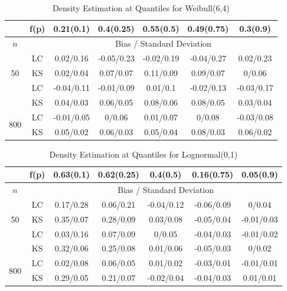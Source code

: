 \documentclass[12pt]{article}
\numberwithin{equation}{section}
\begin{document}
	
\begin{table}[H]

\begin{center}
\caption{Density Estimation at Quantiles for Weibull(6,4)}
\begin{tabular} {| c | c | c | c | c | c | c | } 

	 \hline
		&f(p)&	0.21(0.1)&	0.4(0.25)&	0.55(0.5)&	0.49(0.75)&	0.3(0.9)\\ 
 \hline 
 	$n$ & & \multicolumn{5}{|c|}{Bias / Standard Deviation} 
 \\ 
 \hline 
\multirow{3}{*}{50}		&	LC	&0.02/0.16	&-0.05/0.23	&-0.02/0.19	&-0.04/0.27	&0.02/0.23\\ 
			&	KS	&0.02/0.04	&0.07/0.07	&0.11/0.09	&0.09/0.07	&0/0.06\\ 
	\hline 
\multirow{3}{*}{200}		&	LC	&-0.04/0.11	&-0.01/0.09	&0.01/0.1	&-0.02/0.13	&-0.03/0.17\\ 
			&	KS	&0.04/0.03	&0.06/0.05	&0.08/0.06	&0.08/0.05	&0.03/0.04\\ 
	\hline 
\multirow{3}{*}{800}		&	LC	&-0.01/0.05	&0/0.06	&0.01/0.07	&0/0.08	&-0.03/0.08\\ 
			&	KS	&0.05/0.02	&0.06/0.03	&0.05/0.04	&0.08/0.03	&0.06/0.02\\ 
	\hline 

\end{tabular}
\end{center}
\end{table}	

\begin{table}[H]
\begin{center}

\caption{Density Estimation at Quantiles for Lognormal(0,1)}

\begin{tabular} {| c | c | c | c | c | c | c | } 

	 \hline
		&f(p)&	0.63(0.1)&	0.62(0.25)&	0.4(0.5)&	0.16(0.75)&	0.05(0.9)\\ 
 \hline 
 	$n$ & & \multicolumn{5}{|c|}{Bias / Standard Deviation} 
 \\ 
 \hline 
\multirow{3}{*}{50}		&	LC	&0.17/0.28	&0.06/0.21	&-0.04/0.12	&-0.06/0.09	&0/0.04\\ 
			&	KS	&0.35/0.07	&0.28/0.09	&0.03/0.08	&-0.05/0.04	&-0.01/0.03\\ 
	\hline 
\multirow{3}{*}{200}		&	LC	&0.03/0.16	&0.07/0.09	&0/0.05	&-0.04/0.03	&-0.01/0.02\\ 
			&	KS	&0.32/0.06	&0.25/0.08	&0.01/0.06	&-0.05/0.03	&0/0.02\\ 
	\hline 
\multirow{3}{*}{800}		&	LC	&0.02/0.08	&0.06/0.05	&0.01/0.02	&-0.03/0.01	&-0.01/0.01\\ 
			&	KS	&0.29/0.05	&0.21/0.07	&-0.02/0.04	&-0.04/0.03	&0.01/0.01\\ 
	\hline 

\end{tabular}
\end{center}
\end{table}
\end{document}
